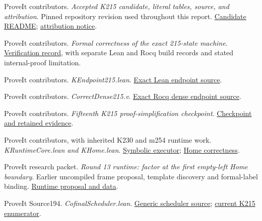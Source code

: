 \documentclass[11pt,letterpaper]{article}
\theoremstyle{definition}
\theoremstyle{remark}
\newcommand{\repo}[2]{\href{https://github.com/VladimirReshetnikov/ProveIt/blob/cbf94cb552a3b49509e0eee80e7455d4eb5974c6/#1}{#2}}
\begin{document}
\begin{thebibliography}{12}
\small
{}
ProveIt contributors. \emph{Accepted K215 candidate, literal tables, source,
and attribution}. Pinned repository revision used throughout this report.
\repo{Computability/BusyBeaver/Research/ZFC/candidate-k215/README.md}{Candidate README};
\repo{Computability/BusyBeaver/Research/ZFC/candidate-k215/NOTICE.md}{attribution notice}.

ProveIt contributors. \emph{Formal correctness of the exact 215-state machine}.
\repo{Computability/BusyBeaver/Research/ZFC/k225-formal/verification/k215/README.md}{Verification record},
with separate Lean and Rocq build records and stated internal-proof limitation.

ProveIt contributors. \emph{KEndpoint215.lean}.
\repo{Computability/BusyBeaver/Lean/BusyBeaver/ZFC/KEndpoint215.lean}{Exact Lean endpoint source}.

ProveIt contributors. \emph{CorrectDense215.v}.
\repo{Computability/BusyBeaver/Research/ZFC/k225-formal/rocq/rocq-extension/coq/215/CorrectDense215.v}{Exact Rocq dense endpoint source}.

ProveIt contributors. \emph{Fifteenth K215 proof-simplification checkpoint}.
\repo{Computability/BusyBeaver/Research/ZFC/k225-formal/verification/k215/simplification/phase15/README.md}{Checkpoint and retained evidence}.

ProveIt contributors, with inherited K230 and m254 runtime work.
\emph{KRuntimeCore.lean and KHome.lean}.
\repo{Computability/BusyBeaver/Lean/BusyBeaver/ZFC/KRuntimeCore.lean}{Symbolic executor};
\repo{Computability/BusyBeaver/Lean/BusyBeaver/ZFC/KHome.lean}{Home correctness}.

ProveIt research packet. \emph{Round 13 runtime: factor at the first
empty-left Home boundary}. Earlier uncompiled frame proposal, template
discovery and formal-label binding.
\repo{Computability/BusyBeaver/Research/ZFC/k225-formal/verification/k215/simplification/proposals/round13-left-frame/runtime/README.md}{Runtime proposal and data}.

ProveIt Source194. \emph{CofinalScheduler.lean}.
\repo{SetTheory/Cardinals/docs/reports/set-theory/zfc-closure-kernels/code/194-scheduler-CofinalScheduler.lean}{Generic scheduler source};
\repo{Computability/BusyBeaver/Lean/BusyBeaver/ZFC/EnumPerm.lean}{current K215 enumerator}.


\end{thebibliography}
\end{document}
